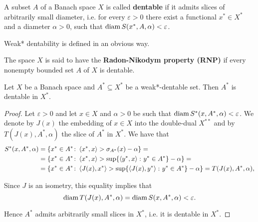 \begin{definition}\cite[definition 5.1]{Phelps1993}
  \label{def:dentability}
  A subset \( A \) of a Banach space \( X \) is called \textbf{dentable} if it admits slices of arbitrarily small diameter, i.e. for every \( \varepsilon > 0 \) there exist a functional \( x^* \in X^* \) and a diameter \( \alpha > 0 \), such that \( \operatorname{diam} S(x^*, A, \alpha) < \varepsilon \).

  Weak* dentability is defined in an obvious way.
\end{definition}

\begin{definition}\cite[definition 5.2]{Phelps1993}
  \label{def:radon-nikodym-property}
  The space \( X \) is said to have the \textbf{Radon-Nikodym property (RNP)} if every nonempty bounded set \( A \) of \( X \) is dentable.
\end{definition}

\begin{proposition}
  \label{thm:weak_dentable_sets_are_dentable}
  Let \( X \) be a Banach space and \( A^* \subseteq X^* \) be a weak*-dentable set. Then \( A^* \) is dentable in \( X^* \).
\end{proposition}
\begin{proof}
  Let \( \varepsilon > 0 \) and let \( x \in X \) and \( \alpha > 0 \) be such that \( \operatorname{diam} S^*(x, A^*, \alpha) < \varepsilon \).
  We denote by \( J(x) \) the embedding of \( x \in X \) into the double-dual \( X^{**} \) and by \( T(J(x), A^*, \alpha) \) the slice of \( A^* \) in \( X^* \). We have that
  \begin{align*}
    S^*(x, A^*, \alpha)
    &=
    \{ x^* \in A^* \colon \left\langle x^*, x \right\rangle > \sigma_{A^*}(x) - \alpha \}
    = \\ &=
    \{ x^* \in A^* \colon \left\langle x^*, x \right\rangle > \sup \{ \left\langle y^*, x \right\rangle \colon y^* \in A^* \} - \alpha \}
    = \\ &=
    \{ x^* \in A^* \colon \left\langle J(x), x^* \right\rangle > \sup \{ \left\langle J(x), y^* \right\rangle \colon y^* \in A^* \} - \alpha \}
    =
    T(J(x), A^*, \alpha),
  \end{align*}

  Since \( J \) is an isometry, this equality implies that
  \begin{equation*}
    \operatorname{diam} T(J(x), A^*, \alpha) = \operatorname{diam} S(x, A^*, \alpha) < \varepsilon.
  \end{equation*}

  Hence \( A^* \) admits arbitrarily small slices in \( X^* \), i.e. it is dentable in \( X^* \).
\end{proof}
